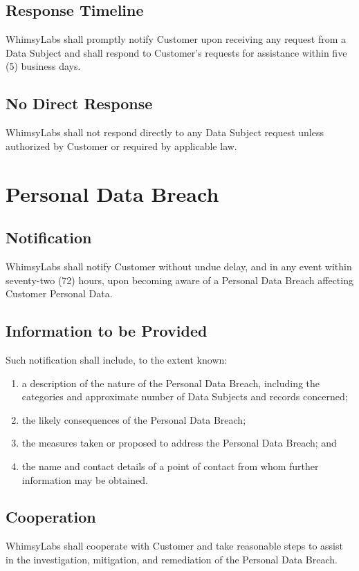 \documentclass[11pt,a4paper]{article}
\begin{document}
\subsection{Response Timeline}
WhimsyLabs shall promptly notify Customer upon receiving any request from a Data Subject and shall respond to Customer's requests for assistance within five (5) business days.

\subsection{No Direct Response}
WhimsyLabs shall not respond directly to any Data Subject request unless authorized by Customer or required by applicable law.

\section{Personal Data Breach}

\subsection{Notification}
WhimsyLabs shall notify Customer without undue delay, and in any event within seventy-two (72) hours, upon becoming aware of a Personal Data Breach affecting Customer Personal Data.

\subsection{Information to be Provided}
Such notification shall include, to the extent known:
\begin{enumerate}[label=(\alph*)]
    \item a description of the nature of the Personal Data Breach, including the categories and approximate number of Data Subjects and records concerned;
    \item the likely consequences of the Personal Data Breach;
    \item the measures taken or proposed to address the Personal Data Breach; and
    \item the name and contact details of a point of contact from whom further information may be obtained.
\end{enumerate}

\subsection{Cooperation}
WhimsyLabs shall cooperate with Customer and take reasonable steps to assist in the investigation, mitigation, and remediation of the Personal Data Breach.
\end{document}
